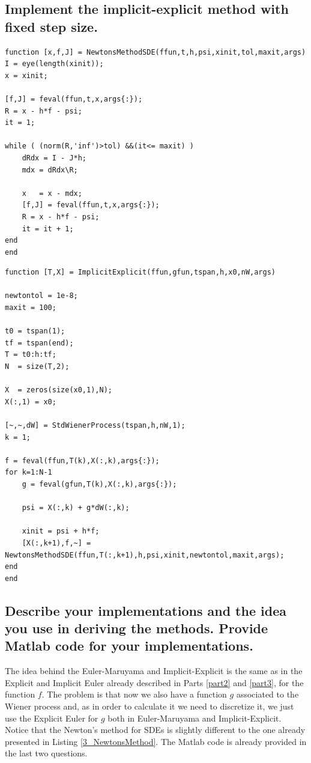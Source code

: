 \pagebreak

\subsection{Implement the implicit-explicit method with fixed step size.}
\begin{lstlisting}[caption = Newton's Method for SDEs, captionpos=b, label=4_NewtonsMethodSDE]
function [x,f,J] = NewtonsMethodSDE(ffun,t,h,psi,xinit,tol,maxit,args)
I = eye(length(xinit));
x = xinit;

[f,J] = feval(ffun,t,x,args{:});
R = x - h*f - psi;
it = 1;

while ( (norm(R,'inf')>tol) &&(it<= maxit) )
    dRdx = I - J*h;
    mdx = dRdx\R;

    x   = x - mdx;
    [f,J] = feval(ffun,t,x,args{:});
    R = x - h*f - psi;
    it = it + 1;
end
end
\end{lstlisting}

\begin{lstlisting}[caption = Implicit-Explicit Method, captionpos=b, label=4_ImplicitExplicit]
function [T,X] = ImplicitExplicit(ffun,gfun,tspan,h,x0,nW,args)

newtontol = 1e-8;
maxit = 100;

t0 = tspan(1);
tf = tspan(end);
T = t0:h:tf;
N  = size(T,2);

X  = zeros(size(x0,1),N);
X(:,1) = x0;

[~,~,dW] = StdWienerProcess(tspan,h,nW,1);
k = 1;

f = feval(ffun,T(k),X(:,k),args{:});
for k=1:N-1
    g = feval(gfun,T(k),X(:,k),args{:});

    psi = X(:,k) + g*dW(:,k);

    xinit = psi + h*f;
    [X(:,k+1),f,~] = NewtonsMethodSDE(ffun,T(:,k+1),h,psi,xinit,newtontol,maxit,args);
end
end

\end{lstlisting}

\subsection{ Describe your implementations and the idea you use in deriving the methods.  Provide Matlab code for your implementations.}
The idea behind the Euler-Maruyama and Implicit-Explicit is the same as in the Explicit and Implicit Euler already described in Parts \ref{part2} and \ref{part3}, for the function $f$. The problem is that now we also have a function $g$ associated to the Wiener process and, as in order to calculate it we need to discretize it, we just use the Explicit Euler for $g$ both in Euler-Maruyama and Implicit-Explicit. Notice that the Newton's method for SDEs is slightly different to the one already presented in Listing \ref{3_NewtonsMethod}. The Matlab code is already provided in the last two questions.

